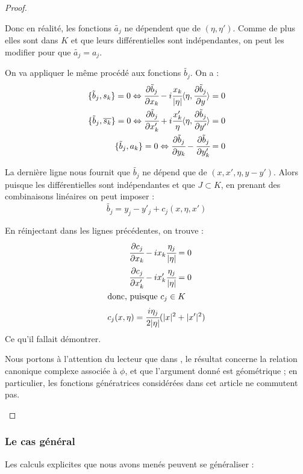 \begin{proof}
\begin{enumerate}
\begin{itemize}
Donc en réalité, les fonctions $\tilde{a_j}$ ne dépendent que de $(\eta,\eta')$. Comme de plus elles sont dans $K$ et que leurs différentielles sont indépendantes, on peut les modifier pour que $\tilde{a_j}=a_j$.

On va appliquer le même procédé aux fonctions $\tilde{b_j}$. On a :
\begin{align*}
  \{\tilde{b}_j,s_k\}=0 \Leftrightarrow \cfrac{\partial \tilde{b}_j}{\partial x_k} - i \cfrac{x_k}{|\eta|}\langle \eta, \cfrac{\partial \tilde{b}_j}{\partial y} \rangle =0\\
  \{\tilde{b}_j,\overline{s_k}\}=0 \Leftrightarrow \cfrac{\partial \tilde{b}_j}{\partial x'_k} + i \cfrac{x'_k}{\eta}\langle \eta, \cfrac{\partial \tilde{b}_j}{\partial y'} \rangle =0\\
  \{\tilde{b}_j,a_k\}=0 \Leftrightarrow \cfrac{\partial \tilde{b}_j}{\partial y_k} - \cfrac{\partial \tilde{b}_j}{\partial y'_k} = 0
\end{align*}

La dernière ligne nous fournit que $\tilde{b_j}$ ne dépend que de $(x,x',\eta,y-y')$. Alors puisque les différentielles sont indépendantes et que $J \subset K$, en prenant des combinaisons linéaires on peut imposer :
\begin{equation*}
  \tilde{b_j} = y_j-y'_j + c_j(x,\eta,x')
\end{equation*}

En réinjectant dans les lignes précédentes, on trouve :
\begin{align*}
  \cfrac{\partial c_j}{\partial x_k} - i x_k\cfrac{\eta_j}{|\eta|} &=0\\
  \cfrac{\partial c_j}{\partial x'_k} - i x'_k\cfrac{\eta_j}{|\eta|} &=0\\
  \intertext{donc, puisque $c_j \in K$}
  c_j(x,\eta) = \cfrac{i\eta_j}{2|\eta|}(|x|^2 &+ |x'|^2)
\end{align*}
Ce qu'il fallait démontrer.
\end{itemize}

Nous portons à l'attention du lecteur que dans \cite{BoutetdeMonvel1975}, le résultat concerne la relation canonique complexe associée à $\phi$, et que  l'argument donné est géométrique ; en particulier, les fonctions génératrices  considérées dans cet article ne commutent pas.

\end{enumerate}
\end{proof}

\subsubsection{Le cas général}
Les calculs explicites que nous avons menés peuvent se généraliser :

